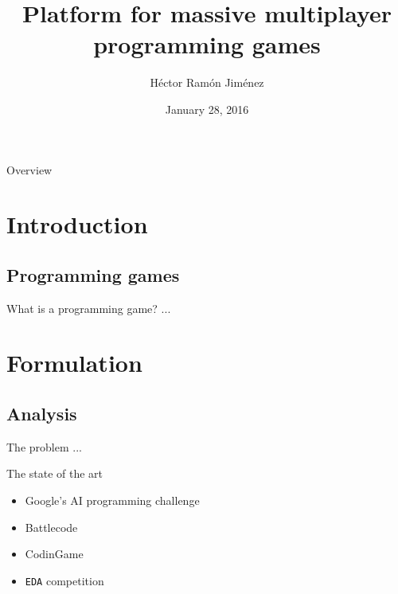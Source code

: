 \documentclass{beamer}
\title{Platform for massive multiplayer programming games}
\institute{Facultat d'Informàtica de Barcelona}
\author{Héctor Ramón Jiménez}
\date{January 28, 2016}
\begin{document}
\frame{\titlepage}
\begin{frame}{Overview}
\tableofcontents
\end{frame}
\section{Introduction}
\subsection{Programming games}
\begin{frame}{What is a programming game?}
...
\end{frame}
\section{Formulation}
\subsection{Analysis}
\begin{frame}{The problem}
...
\end{frame}
\begin{frame}{The state of the art}
\begin{itemize}
\item
Google's AI programming challenge \cite{google_ai}
\item
Battlecode \cite{battlecode}
\item
CodinGame \cite{codingame}
\item
\texttt{EDA} competition \cite{eda}
\end{itemize}
\end{frame}
\end{document}
